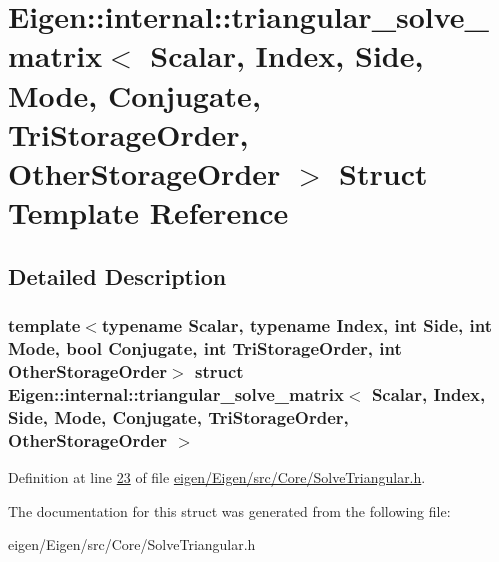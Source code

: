 \hypertarget{struct_eigen_1_1internal_1_1triangular__solve__matrix}{}\section{Eigen\+:\+:internal\+:\+:triangular\+\_\+solve\+\_\+matrix$<$ Scalar, Index, Side, Mode, Conjugate, Tri\+Storage\+Order, Other\+Storage\+Order $>$ Struct Template Reference}
\label{struct_eigen_1_1internal_1_1triangular__solve__matrix}


\subsection{Detailed Description}
\subsubsection*{template$<$typename Scalar, typename Index, int Side, int Mode, bool Conjugate, int Tri\+Storage\+Order, int Other\+Storage\+Order$>$\newline
struct Eigen\+::internal\+::triangular\+\_\+solve\+\_\+matrix$<$ Scalar, Index, Side, Mode, Conjugate, Tri\+Storage\+Order, Other\+Storage\+Order $>$}



Definition at line \hyperlink{eigen_2_eigen_2src_2_core_2_solve_triangular_8h_source_l00023}{23} of file \hyperlink{eigen_2_eigen_2src_2_core_2_solve_triangular_8h_source}{eigen/\+Eigen/src/\+Core/\+Solve\+Triangular.\+h}.



The documentation for this struct was generated from the following file\+:\begin{DoxyCompactItemize}
\item 
eigen/\+Eigen/src/\+Core/\+Solve\+Triangular.\+h\end{DoxyCompactItemize}
